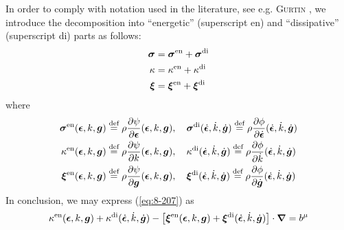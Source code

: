 In order to comply with notation used in the literature, see e.g. 
{\scshape Gurtin} \cite{Gurtin2000}, we introduce the decomposition 
into ``energetic'' (superscript en) and ``dissipative'' (superscript di)
 parts as follows:
\begin{subequations}\label{eq:8-409}
    \begin{align}
    \bm{\sigma} &= \bm{\sigma}^{\mathrm{en}}  + \bm{\sigma}^{\mathrm{di}} 
\label{eq:8-409a}\\
    \kappa &= \kappa^{\mathrm{en}}  + \kappa^{\mathrm{di}} 
\label{eq:8-409b}\\
    \bm{\xi} &= \bm{\xi}^{\mathrm{en}}  + \bm{\xi}^{\mathrm{di}} 
\label{eq:8-409c}
    \end{align}
\end{subequations}
where
\begin{subequations}\label{eq:8-209}
    \begin{align}
    \bm{\sigma}^{\mathrm{en}} (\bm{\epsilon},k,\bm {g}) &\stackrel{\text{def}}{=} \rho\frac{\partial \psi}{\partial \bm{\epsilon}}(\bm{\epsilon},k,\bm {g}), \quad
    \bm{\sigma}^{\mathrm{di}} (\dot{\bm{\epsilon}},\dot{k},\dot{\bm {g}}) \stackrel{\text{def}}{=} \rho\frac{\partial \phi}{\partial \dot{\bm{\epsilon}}}
    (\dot{\bm{\epsilon}},\dot{k},\dot{\bm {g}})
\label{eq:8-209a}\\
    \kappa^{\mathrm{en}} (\bm{\epsilon},k,\bm {g}) &\stackrel{\text{def}}{=} \rho\frac{\partial \psi}{\partial k}(\bm{\epsilon},k,\bm {g}), \quad
    \kappa^{\mathrm{di}} (\dot{\bm{\epsilon}},\dot{k},\dot{\bm {g}}) \stackrel{\text{def}}{=} \rho\frac{\partial \phi}{\partial \dot{k}}
    (\dot{\bm{\epsilon}},\dot{k},\dot{\bm {g}})
\label{eq:8-209b}\\
    \bm{\xi}^{\mathrm{en}} (\bm{\epsilon},k,\bm {g}) &\stackrel{\text{def}}{=} \rho\frac{\partial \psi}{\partial \bm {g}}(\bm{\epsilon},k,\bm {g}), \quad
    \bm{\xi}^{\mathrm{di}} (\dot{\bm{\epsilon}},\dot{k},\dot{\bm {g}}) \stackrel{\text{def}}{=} \rho\frac{\partial \phi}{\partial \dot{\bm {g}}}
    (\dot{\bm{\epsilon}},\dot{k},\dot{\bm {g}})
\label{eq:8-209c}
    \end{align}
\end{subequations}
In conclusion, we may express (\ref{eq:8-207}) as
\begin{equation}
    \kappa^{\mathrm{en}} (\bm{\epsilon},k,\bm {g}) + \kappa^{\mathrm{di}} (\dot{\bm{\epsilon}},\dot{k},\dot{\bm {g}}) -
    \left[\bm{\xi}^{\mathrm{en}} (\bm{\epsilon},k,\bm {g}) + \bm{\xi}^{\mathrm{di}} (\dot{\bm{\epsilon}},\dot{k},\dot{\bm {g}})\right]
    \cdot{\bm\nabla}= b^{\mathrm{\mu}}
\label{eq:8-404} 
\end{equation}

